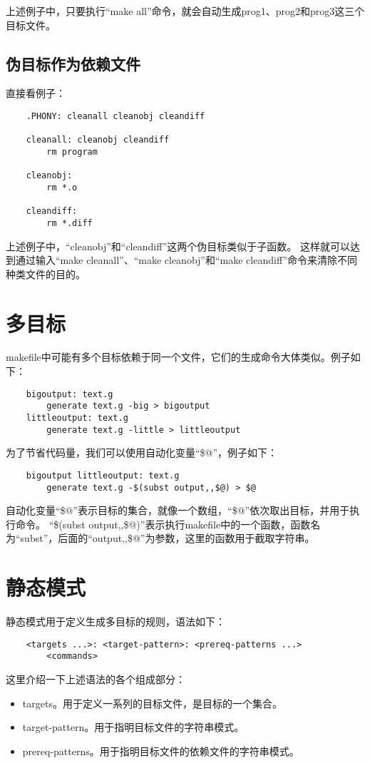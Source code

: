 \documentclass[a4paper,left=2.5cm,right=2.5cm,11pt]{article}
\begin{document}
	上述例子中，只要执行“make all”命令，就会自动生成prog1、prog2和prog3这三个目标文件。

\subsection{伪目标作为依赖文件}
	直接看例子：
	\begin{lstlisting}
	.PHONY: cleanall cleanobj cleandiff

	cleanall: cleanobj cleandiff
		rm program

	cleanobj:
		rm *.o

	cleandiff:
		rm *.diff
	\end{lstlisting}

	上述例子中，“cleanobj”和“cleandiff”这两个伪目标类似于子函数。
	这样就可以达到通过输入“make cleanall”、“make cleanobj”和“make cleandiff”命令来清除不同种类文件的目的。

\section{多目标}
	makefile中可能有多个目标依赖于同一个文件，它们的生成命令大体类似。例子如下：
	\begin{lstlisting}
	bigoutput: text.g
		generate text.g -big > bigoutput
	littleoutput: text.g
		generate text.g -little > littleoutput
	\end{lstlisting}

	为了节省代码量，我们可以使用自动化变量“\$@”，例子如下：
	\begin{lstlisting}
	bigoutput littleoutput: text.g
		generate text.g -$(subst output,,$@) > $@
	\end{lstlisting}

	自动化变量“\$@”表示目标的集合，就像一个数组，“\$@”依次取出目标，并用于执行命令。
	“\$(subst output,,\$@)”表示执行makefile中的一个函数，函数名为“subst”，后面的“output,,\$@”为参数，这里的函数用于截取字符串。

\section{静态模式}
	静态模式用于定义生成多目标的规则，语法如下：
	\begin{lstlisting}
	<targets ...>: <target-pattern>: <prereq-patterns ...>
		<commands>
	\end{lstlisting}

	这里介绍一下上述语法的各个组成部分：
	\begin{itemize}
		\item targets。用于定义一系列的目标文件，是目标的一个集合。
		\item target-pattern。用于指明目标文件的字符串模式。
		\item prereq-patterns。用于指明目标文件的依赖文件的字符串模式。
	\end{itemize}
\end{document}
